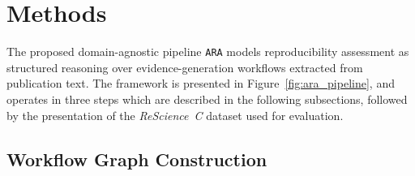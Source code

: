 \documentclass{article}
\begin{document}

\section{Methods}

The proposed domain-agnostic pipeline \texttt{ARA} models reproducibility assessment as structured reasoning over evidence-generation workflows extracted from publication text. 
The framework is presented in Figure~\ref{fig:ara_pipeline}, and operates in three steps which are described in the following subsections, followed by the presentation of the \textit{ReScience~C} dataset used for evaluation.

\subsection{Workflow Graph Construction}
\end{document}
